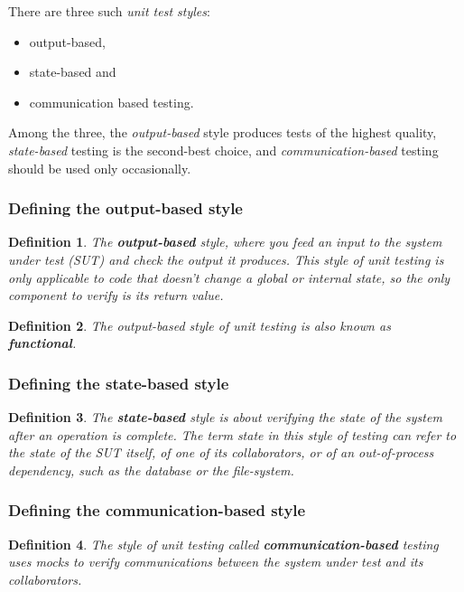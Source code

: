 \documentclass{article}
\newtheorem{definition}{Definition}
\begin{document}
There are three such \textit{unit test styles}:
\begin{itemize}
	\item output-based,
	\item state-based and
	\item	 communication based testing.
\end{itemize}
Among the three, the \textit{output-based} style produces tests of the highest
quality, \textit{state-based} testing is the second-best choice, and \textit{communication-based}
testing should be used only occasionally.

\subsubsection{Defining the output-based style}

\begin{definition}
The \textbf{output-based} style, where you feed an input to the system under test (SUT) and check the output it produces. This style of unit testing is only applicable to code that doesn’t change a global or internal state, so the only component to verify is its return value.
\end{definition}

\begin{definition}
The \textit{output-based} style of unit testing is also known as \textbf{functional}.
\end{definition}


\subsubsection{Defining the state-based style}

\begin{definition}
The \textbf{state-based} style is about verifying the state of the system after an operation is complete. The term state in this style of testing can refer to the state of the SUT itself, of one of its collaborators, or of an out-of-process dependency, such as the database or the file-system.
\end{definition}

\subsubsection{Defining the communication-based style}

\begin{definition}
The  style of unit testing called \textbf{communication-based} testing uses mocks to verify communications between the system under test and its collaborators.
\end{definition}
\end{document}
